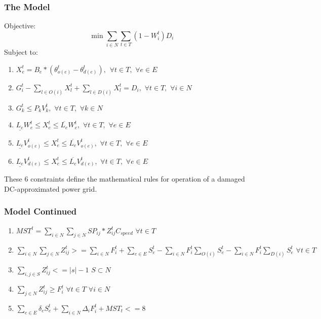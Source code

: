 \documentclass[t, pdftex]{beamer}
\begin{document}
\begin{frame}
\frametitle{The Model}
Objective:
$$ \min \sum_{i \in N} \sum_{t \in T} (1-W_i^t)D_i $$
Subject to:
	\begin{enumerate}[label=(\arabic*), leftmargin=*, itemsep=0.4ex, before={\everymath{\displaystyle}}]
	
	\item $ X_e^t = B_e * (\theta_{o(e)}^t - \theta_{d(e)}^t), \hspace{5pt} \forall t \in T, \hspace{4pt} \forall e \in E$
	\item $ G_i^t - \sum_{l \in O(i)} X_l^t + \sum_{l \in D(i)} X_l^t = D_i, \hspace{4pt} \forall t \in T, \hspace{4pt} \forall i \in N$
	\item $G_k^t \leq P_{k} V_{k}^t, \hspace{4pt} \forall t \in T, \hspace{4pt} \forall k \in N$
	\item $\underline{L_e}W_{e}^t \leq X_{e}^t \leq \overline{L_e}W_{e}^t, \hspace{4pt} \forall t \in T, \hspace{4pt} \forall e \in E$
	\item $\underline{L_e}V_{o(e)}^t \leq X_{e}^t \leq \overline{L_e}V_{o(e)}^t, \hspace{4pt} \forall t \in T, \hspace{4pt} \forall e \in E$
	\item $\underline{L_e}V_{d(e)}^t \leq X_{e}^t \leq \overline{L_e}V_{d(e)}^t, \hspace{4pt} \forall t \in T, \hspace{4pt} \forall e \in E$
	\end{enumerate}
These 6 constraints define the mathematical rules for operation of a damaged DC-approximated power grid.
\end{frame}
\begin{frame}
\frametitle{Model Continued}
	\begin{enumerate}[label=(\arabic*), leftmargin=*, itemsep=0.4ex, before={\everymath{\displaystyle}}]
	\item $MST^t = \sum_{i \in N} \sum_{j \in N} SP_{ij}*Z_{ij}^{t} C_{speed}\hspace{4pt} \forall t \in T $
	\item $\sum_{i \in N} \sum_{j \in N} Z_{ij}^{t} >= \sum_{i \in N} F_i^t + \sum_{e \in E} S_e^t - \sum_{i \in N} F_i^t \sum_{O(i)} S_e^t - \sum_{i \in N} F_i^t \sum_{D(i)} S_e^t \hspace{4pt} \forall t \in T$
	\item $\sum_{i,j \in S} Z_{ij}^t <= |s|-1 \hspace{4pt} S\subset N$
	\item $ \sum_{j \in N} Z_{ij}^t \geq F_i^t \hspace{4pt} \forall t \in T\hspace{4pt} \forall i \in N $
	\item $ \sum_{e \in E} \delta_{e}S_e^t + \sum_{i \in N}\Delta_{i}F_i^t + MST_t <=8$
\end{enumerate}

\end{frame}
\end{document}
